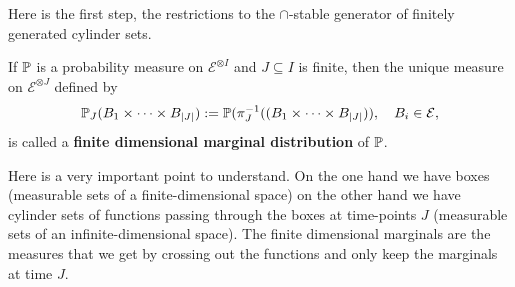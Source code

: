 Here is the first step, the restrictions to the $\cap$-stable generator of finitely generated cylinder sets.
\begin{ldef}
\begin{deff}\label{def:SL}
	If $\P$ is a probability measure on $\mathcal E^{\otimes I}$ and $J\subseteq I$ is finite, then the unique measure on $\mathcal E^{\otimes J}$ defined by
	\begin{align*}
		\P_J(B_1\times \cdots \times B_{|J|}):=\P(\pi_{J}^{-1}((B_1\times \cdots \times B_{|J|})),\quad B_i\in \mathcal E,
	\end{align*}
	is called a \textbf{finite dimensional marginal distribution} of $\P$.
\end{deff}
\end{ldef}
Here is a very important point to understand. On the one hand we have boxes (measurable sets of a finite-dimensional space) on the other hand we have cylinder sets of functions passing through the boxes at time-points $J$ (measurable sets of an infinite-dimensional space). The finite dimensional marginals are the measures that we get by crossing out the functions and only keep the marginals at time $J$.

